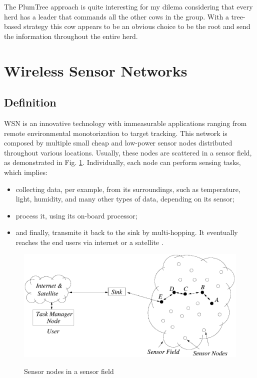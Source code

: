 The PlumTree approach is quite interesting for my dilema considering that every herd has a
leader that commands all the other cows in the group. With a tree-based strategy this cow
appears to be an obvious choice to be the root and send the information throughout the
entire herd.


\section{Wireless Sensor Networks}
\label{sec:wireless_sensor_networks}

\subsection{Definition}
\label{subsec:wsn_definition}
\Gls{WSN} is an innovative technology with immeasurable applications ranging from remote
environmental monotorization to target tracking. This network is composed by multiple small
cheap and low-power sensor nodes distributed throughout various locations. Usually, these nodes
are scattered in a sensor field, as demonstrated in Fig. \ref{fig:sensor_nodes_in_sensor_fields}.
Individually, each node can perform sensing tasks, which implies:
\begin{itemize}
    \item collecting data, per example, from its surroundings, such as temperature, light,
          humidity, and many other types of data, depending on its sensor;
    \item process it, using its on-board processor;
    \item and finally, transmite it back to the sink by multi-hopping. It eventually reaches
          the end users via internet or a satellite \cite{Akyildiz2002}.
\end{itemize}

\begin{figure}[h]
    \caption{Sensor nodes in a sensor field \cite{Akyildiz2002}}
    \centering
    \includegraphics[scale=0.5]{Chapters/Figures/sensor_nodes_in_sensor_fields.png}
    \label{fig:sensor_nodes_in_sensor_fields}
\end{figure}

